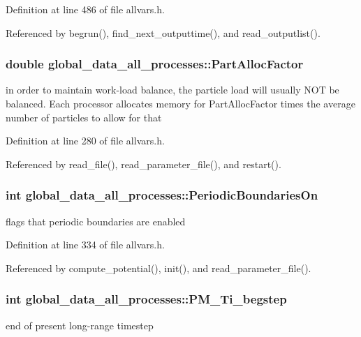 Definition at line 486 of file allvars.h.



Referenced by begrun(), find\_\-next\_\-outputtime(), and read\_\-outputlist().

\hypertarget{structglobal__data__all__processes_aa9ceb5cacadcf2cadfc7154ab8d7fc88}{
\subsubsection[{PartAllocFactor}]{\setlength{\rightskip}{0pt plus 5cm}double {\bf global\_\-data\_\-all\_\-processes::PartAllocFactor}}}
\label{structglobal__data__all__processes_aa9ceb5cacadcf2cadfc7154ab8d7fc88}
in order to maintain work-\/load balance, the particle load will usually NOT be balanced. Each processor allocates memory for PartAllocFactor times the average number of particles to allow for that 

Definition at line 280 of file allvars.h.



Referenced by read\_\-file(), read\_\-parameter\_\-file(), and restart().

\hypertarget{structglobal__data__all__processes_a52b027433ffad064869c606656e9bf7d}{
\subsubsection[{PeriodicBoundariesOn}]{\setlength{\rightskip}{0pt plus 5cm}int {\bf global\_\-data\_\-all\_\-processes::PeriodicBoundariesOn}}}
\label{structglobal__data__all__processes_a52b027433ffad064869c606656e9bf7d}
flags that periodic boundaries are enabled 

Definition at line 334 of file allvars.h.



Referenced by compute\_\-potential(), init(), and read\_\-parameter\_\-file().

\hypertarget{structglobal__data__all__processes_a53412b692a49924318748259987031aa}{
\subsubsection[{PM\_\-Ti\_\-begstep}]{\setlength{\rightskip}{0pt plus 5cm}int {\bf global\_\-data\_\-all\_\-processes::PM\_\-Ti\_\-begstep}}}
\label{structglobal__data__all__processes_a53412b692a49924318748259987031aa}
end of present long-\/range timestep 

